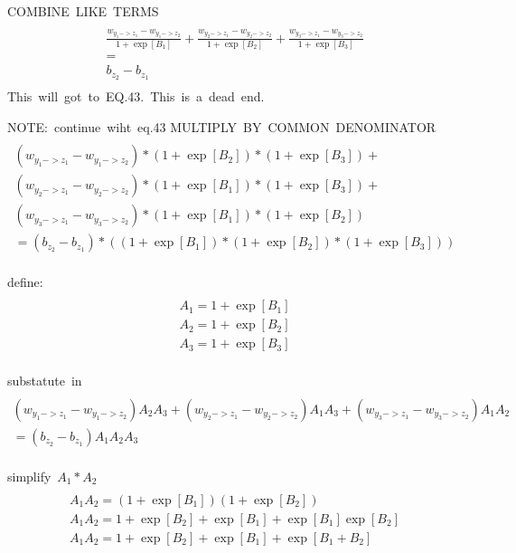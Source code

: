 \documentclass{article}
\begin{document}
\hbox{COMBINE LIKE TERMS}
\begin{multline}
    \\
        \frac{w_{y_1->z_1} - w_{y_1->z_2}}
            {1+\exp[B_1]} + 
        \frac{w_{y_2->z_1} - w_{y_2->z_2}}
            {1+\exp[B_2]} + 
        \frac{w_{y_3->z_1} - w_{y_3->z_2}}
            {1+\exp[B_3]} 
        \\=\\
         b_{z_2} - b_{z_1}
    \\
\end{multline}
\hbox{This will got to EQ.43. This is a dead end.}

\hbox{NOTE: continue wiht eq.43}
\hbox{MULTIPLY BY COMMON DENOMINATOR}
\begin{multline}
    \\
    (w_{y_1->z_1} - w_{y_1->z_2}) * (1+\exp[B_2]) * (1+\exp[B_3]) +\\
    (w_{y_2->z_1} - w_{y_2->z_2}) * (1+\exp[B_1]) * (1+\exp[B_3]) +\\
    (w_{y_3->z_1} - w_{y_3->z_2}) * (1+\exp[B_1]) * (1+\exp[B_2]) 
    \\= (b_{z_2} - b_{z_1}) * ((1+\exp[B_1]) * (1+\exp[B_2]) * (1+\exp[B_3]))
    \\
\end{multline}

\hbox{define:}
\begin{multline}
    \\
    A_1 = 1+\exp[B_1]\\
    A_2 = 1+\exp[B_2]\\
    A_3 = 1+\exp[B_3]\\
\end{multline}

\hbox{substatute in}
\begin{multline}
    \\
    (w_{y_1->z_1} - w_{y_1->z_2}) A_2 A_3 +
    (w_{y_2->z_1} - w_{y_2->z_2}) A_1 A_3 +
    (w_{y_3->z_1} - w_{y_3->z_2}) A_1 A_2 
    \\= (b_{z_2} - b_{z_1}) A_1 A_2 A_3
    \\
\end{multline}

\hbox{simplify $A_1 * A_2$}
\begin{multline}
    \\
    A_1A_2 = (1+\exp[B_1])(1+\exp[B_2])\\
    A_1A_2 = 1 + \exp[B_2] + \exp[B_1] + \exp[B_1]\exp[B_2] \\
    A_1A_2 = 1 + \exp[B_2] + \exp[B_1] + \exp[B_1+B_2] \\
\end{multline}
\end{document}
